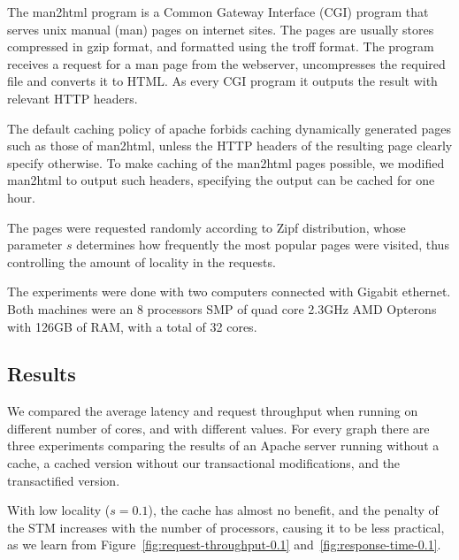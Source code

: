 \documentclass[preprint,11pt]{sigplanconf}
\begin{document}
The man2html program is a Common Gateway Interface (CGI) program that serves
unix manual (man) pages on internet sites. The pages are usually stores
compressed in gzip format, and formatted using the troff format. The program
receives a request for a man page from the webserver, uncompresses the required
file and converts it to HTML. As every CGI program it outputs the result with
relevant HTTP headers.

The default caching policy of apache forbids caching dynamically generated pages
such as those of man2html, unless the HTTP headers of the resulting page clearly
specify otherwise. To make caching of the man2html pages possible, we modified
man2html to output such headers, specifying the output can be cached for one
hour.

The pages were requested randomly according to Zipf distribution, whose
parameter $s$ determines how frequently the most popular pages were visited,
thus controlling the amount of locality in the requests.

The experiments were done with two computers connected with Gigabit ethernet.
Both machines were an 8 processors SMP of quad core 2.3GHz AMD Opterons 
with 126GB of RAM, with a total of 32 cores. 

\subsection{Results} 
We compared the average latency and request throughput when running on different
number of cores, and with different  values. For every graph there are three
experiments comparing the results of an Apache server running without a cache, a
cached version without our transactional modifications, and the transactified
version. 

With low locality ($s=0.1$), the cache has almost no benefit, and the penalty of
the STM increases with the number of processors, causing it to be less
practical, as we learn from Figure~\ref{fig:request-throughput-0.1}
and~\ref{fig:response-time-0.1}. 
\end{document}
